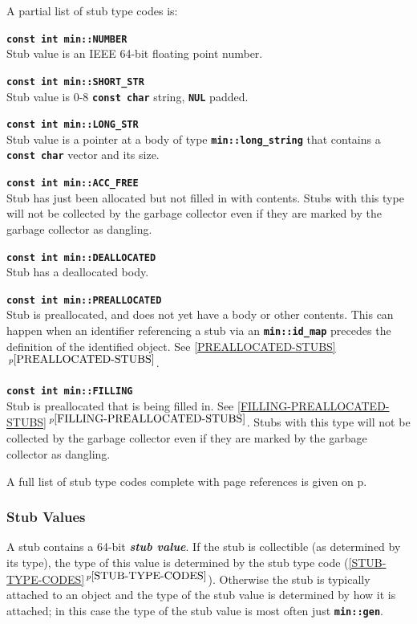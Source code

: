 \documentclass[12pt]{article}
\newcommand{\TT}[1]{{\tt \bfseries #1}}
\newcommand{\key}[1]{{\bf \em #1}\index{#1}}
\newcommand{\itemref}[1]{\ref{#1}$\,^{p\pageref{#1}}$}
\newcommand{\pagref}[1]{p\pageref{#1}}
\newcommand{\EOL}{\penalty \exhyphenpenalty}
\newenvironment{indpar}[1][0.3in]%
	{\begin{list}{}%
		     {\setlength{\itemsep}{0in}%
		      \setlength{\topsep}{0in}%
		      \setlength{\parsep}{1ex}%
		      \setlength{\labelwidth}{#1}%
		      \setlength{\leftmargin}{#1}%
		      \addtolength{\leftmargin}{\labelsep}}%
	 \item}%
	{\end{list}}
\begin{document}
A partial list of stub type codes is:

\begin{indpar}
\begin{list}{}{}
\item[\TT{const int min::NUMBER}]~\\
Stub value is an IEEE 64-bit floating point number.
\item[\TT{const int min::SHORT\_STR}]~\\
Stub value is 0-8 \TT{const char} string, \TT{NUL} padded.
\item[\TT{const int min::LONG\_STR}]~\\
Stub value is a pointer at a body of type \TT{min::long\_\EOL string}
that contains a \TT{const char} vector and its size. 
\item[\TT{const int min::ACC\_FREE}]~\\
Stub has just been allocated but not filled in with contents.
Stubs with this type will not be collected by the garbage collector
even if they are marked by the garbage collector as dangling.
\item[\TT{const int min::DEALLOCATED}]~\\
Stub has a deallocated body.
\item[\TT{const int min::PREALLOCATED}]~\\
Stub is preallocated, and does not yet have a body or other
contents.
This can happen when an identifier referencing a stub via
an \TT{min::\EOL id\_\EOL map} precedes the definition of the
identified object.  See \itemref{PREALLOCATED-STUBS}.
\item[\TT{const int min::FILLING}]~\\
Stub is preallocated that is being filled in.
See \itemref{FILLING-PREALLOCATED-STUBS}.
Stubs with this type will not be collected by the garbage collector
even if they are marked by the garbage collector as dangling.

\end{list}
\end{indpar}

A full list of stub type codes complete with page references
is given on \pagref{STUB-TYPE-CODE-LIST}.

\subsubsection{Stub Values}
\label{STUB-VALUES}

A stub contains a 64-bit \key{stub value}.  If the stub is collectible
(as determined by its type), the type of this value
is determined by the stub type code (\itemref{STUB-TYPE-CODES}).
Otherwise the stub is typically attached to an object and the type of the stub
value is determined by how it is attached; in this case the type of the
stub value is most often just \TT{min::gen}.
\end{document}
